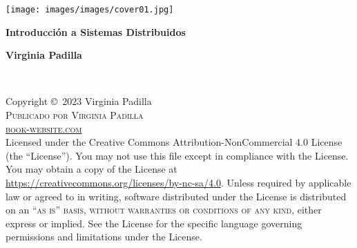 \documentclass[
	12pt, %
	fleqn, %
	a4paper, %
]{LegrandOrangeBook}
\begin{document}

\titlepage %
	{\texttt{[image: images/images/cover01.jpg]}} %
	{ %
		\centering\sffamily %
		{\Huge\bfseries Introducci\'on a Sistemas Distribuidos\par} %
		\vspace{24pt} %
		{\huge\bfseries Virginia Padilla\par} %
	}


\thispagestyle{empty} %

~\vfill %

\noindent Copyright \copyright\ 2023 Virginia Padilla\\ %

\noindent \textsc{Publicado por Virginia Padilla}\\ %

\noindent \textsc{\href{https://github.com/VirginiaPadilla/Book-Distribuidos}{book-website.com}}\\ %

\noindent Licensed under the Creative Commons Attribution-NonCommercial 4.0 License (the ``License''). You may not use this file except in compliance with the License. You may obtain a copy of the License at \url{https://creativecommons.org/licenses/by-nc-sa/4.0}. Unless required by applicable law or agreed to in writing, software distributed under the License is distributed on an \textsc{``as is'' basis, without warranties or conditions of any kind}, either express or implied. See the License for the specific language governing permissions and limitations under the License.\\ %
\end{document}
